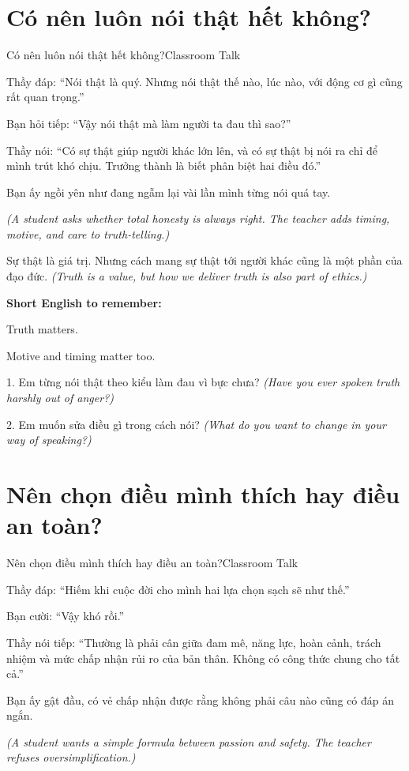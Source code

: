 \section{Có nên luôn nói thật hết không?}
\begin{truyen}{Có nên luôn nói thật hết không?}{Classroom Talk}

Thầy đáp: ``Nói thật là quý. Nhưng nói thật thế nào, lúc nào, với động cơ gì cũng rất quan trọng.''

Bạn hỏi tiếp: ``Vậy nói thật mà làm người ta đau thì sao?''

Thầy nói: ``Có sự thật giúp người khác lớn lên, và có sự thật bị nói ra chỉ để mình trút khó chịu. Trưởng thành là biết phân biệt hai điều đó.''

Bạn ấy ngồi yên như đang ngẫm lại vài lần mình từng nói quá tay.

\textit{(A student asks whether total honesty is always right. The teacher adds timing, motive, and care to truth-telling.)}
\end{truyen}

\begin{baihoc}
Sự thật là giá trị. Nhưng cách mang sự thật tới người khác cũng là một phần của đạo đức.
\textit{(Truth is a value, but how we deliver truth is also part of ethics.)}
\end{baihoc}

\begin{ghinhoanh}
\textbf{Short English to remember:}

Truth matters.

Motive and timing matter too.
\end{ghinhoanh}

\begin{tuhocnhanh}
1. Em từng nói thật theo kiểu làm đau vì bực chưa? \textit{(Have you ever spoken truth harshly out of anger?)}

2. Em muốn sửa điều gì trong cách nói? \textit{(What do you want to change in your way of speaking?)}
\end{tuhocnhanh}
\ngancach

\section{Nên chọn điều mình thích hay điều an toàn?}
\begin{truyen}{Nên chọn điều mình thích hay điều an toàn?}{Classroom Talk}

Thầy đáp: ``Hiếm khi cuộc đời cho mình hai lựa chọn sạch sẽ như thế.''

Bạn cười: ``Vậy khó rồi.''

Thầy nói tiếp: ``Thường là phải cân giữa đam mê, năng lực, hoàn cảnh, trách nhiệm và mức chấp nhận rủi ro của bản thân. Không có công thức chung cho tất cả.''

Bạn ấy gật đầu, có vẻ chấp nhận được rằng không phải câu nào cũng có đáp án ngắn.

\textit{(A student wants a simple formula between passion and safety. The teacher refuses oversimplification.)}
\end{truyen}

